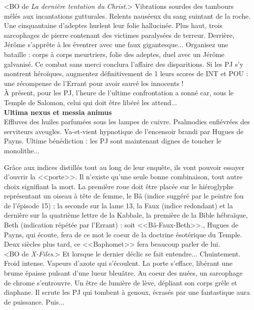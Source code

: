 \documentclass[11pt,twoside,a4paper]{book}
\begin{document}
<BO de \emph{La derni{\`e}re tentation du Christ}.> Vibrations sourdes des tambours m{\^e}l{\'e}s aux incantations gutturales. Relents naus{\'e}eux du sang suintant de la roche. Une cinquantaine d'adeptes hurlent leur folie hallucin{\'e}e. Plus haut, trois sarcophages de pierre contenant des victimes paralys{\'e}es de terreur. Derri{\`e}re, J{\'e}r{\^o}me s'appr{\^e}te {\`a} les {\'e}ventrer avec une faux gigantesque... Organisez une bataille : corps {\`a} corps meurtriers, folie des adeptes, duel avec un J{\'e}r{\^o}me galvanis{\'e}. Ce combat sans merci conclura l'affaire des disparitions. Si les PJ s'y montrent h{\'e}ro{\"i}ques, augmentez d{\'e}finitivement de 1 leurs scores de INT et POU : une r{\'e}compense de l'Errant pour avoir sauv{\'e} les innocents !~\\

{\`A} pr{\'e}sent, pour les PJ, l'heure de l'ultime confrontation a sonn{\'e} car, sous le Temple de Salomon, celui qui doit {\^e}tre lib{\'e}r{\'e} les attend...~\\

\textbf{\large Ultima nexus et messia animus}~\\

Effluves des huiles parfum{\'e}es sous les lampes de cuivre. Psalmodies enfi{\'e}vr{\'e}es des serviteurs aveugles. Va-et-vient hypnotique de l'encensoir brandi par Hugues de Payns. Ultime b{\'e}n{\'e}diction : les PJ sont maintenant dignes de toucher le monolithe...~\\

\clearpage

Gr{\^a}ce aux indices distill{\'e}s tout au long de leur enqu{\^e}te, ils vont pouvoir essayer d'ouvrir la <<porte>>. Il n'existe qu'une seule bonne combinaison, tout autre choix signifiant la mort. La premi{\`e}re roue doit {\^e}tre plac{\'e}e sur le hi{\'e}roglyphe repr{\'e}sentant un oiseau {\`a} t{\^e}te de femme, le B{\^a} (indice sugg{\'e}r{\'e} par le peintre fou de l'{\'e}pisode 15) ; la seconde sur la lame 13, la Faux (indice redondant) et la derni{\`e}re sur la quatri{\`e}me lettre de la Kabbale, la premi{\`e}re de la Bible h{\'e}bra{\"i}que, Beth (indication r{\'e}p{\'e}t{\'e}e par l'Errant) : soit <<B{\^a}-Faux-Beth>>., Hugues de Payns, qui {\'e}coute, fera de ce mot le coeur de la doctrine {\'e}sot{\'e}rique du Temple. Deux si{\`e}cles plus tard, ce <<Baphomet>> fera beaucoup parler de lui.~\\

<BO de \emph{X-Files}.> Et lorsque le dernier d{\'e}clic se fait entendre... Chuintement. Froid intense. Vapeurs d'azote qui s'{\'e}coulent. La porte s'efface, lib{\'e}rant une brume {\'e}paisse pulsant d'une lueur bleu{\^a}tre. Au coeur des nu{\'e}es, un sarcophage de chrome s'entrouvre. Un {\^e}tre de lumi{\`e}re de l{\`e}ve, d{\'e}pliant son corps gr{\^e}le et diaphane. Il scrute les PJ qui tombent {\`a} genoux, {\'e}cras{\'e}s par une fantastique aura de puissance. Puis...~\\
\end{document}
